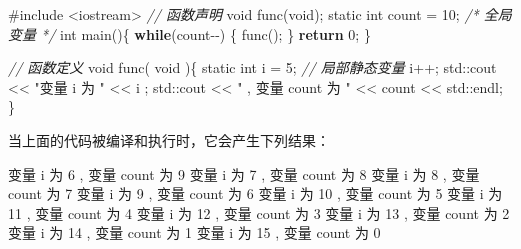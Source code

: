 \documentclass[
]{article}
\newenvironment{Shaded}{}{}
\newcommand{\AttributeTok}[1]{\textcolor[rgb]{0.49,0.56,0.16}{#1}}
\newcommand{\BuiltInTok}[1]{#1}
\newcommand{\CommentTok}[1]{\textcolor[rgb]{0.38,0.63,0.69}{\textit{#1}}}
\newcommand{\ControlFlowTok}[1]{\textcolor[rgb]{0.00,0.44,0.13}{\textbf{#1}}}
\newcommand{\DataTypeTok}[1]{\textcolor[rgb]{0.56,0.13,0.00}{#1}}
\newcommand{\DecValTok}[1]{\textcolor[rgb]{0.25,0.63,0.44}{#1}}
\newcommand{\ImportTok}[1]{#1}
\newcommand{\NormalTok}[1]{#1}
\newcommand{\OperatorTok}[1]{\textcolor[rgb]{0.40,0.40,0.40}{#1}}
\newcommand{\PreprocessorTok}[1]{\textcolor[rgb]{0.74,0.48,0.00}{#1}}
\newcommand{\StringTok}[1]{\textcolor[rgb]{0.25,0.44,0.63}{#1}}
\begin{document}
\begin{Shaded}
\begin{Highlighting}[]
\PreprocessorTok{\#include }\ImportTok{\textless{}iostream\textgreater{}}
 \CommentTok{// 函数声明}
\DataTypeTok{void}\NormalTok{ func}\OperatorTok{(}\DataTypeTok{void}\OperatorTok{);} 
\AttributeTok{static} \DataTypeTok{int}\NormalTok{ count }\OperatorTok{=} \DecValTok{10}\OperatorTok{;} \CommentTok{/* 全局变量 */}
\DataTypeTok{int}\NormalTok{ main}\OperatorTok{()\{}
   \ControlFlowTok{while}\OperatorTok{(}\NormalTok{count}\OperatorTok{{-}{-})}
   \OperatorTok{\{}
\NormalTok{      func}\OperatorTok{();}
   \OperatorTok{\}}
   \ControlFlowTok{return} \DecValTok{0}\OperatorTok{;}
\OperatorTok{\}}

\CommentTok{// 函数定义}
\DataTypeTok{void}\NormalTok{ func}\OperatorTok{(} \DataTypeTok{void} \OperatorTok{)\{}
   \AttributeTok{static} \DataTypeTok{int}\NormalTok{ i }\OperatorTok{=} \DecValTok{5}\OperatorTok{;} \CommentTok{// 局部静态变量}
\NormalTok{   i}\OperatorTok{++;}
   \BuiltInTok{std::}\NormalTok{cout}\OperatorTok{ \textless{}\textless{}} \StringTok{"变量 i 为 "} \OperatorTok{\textless{}\textless{}}\NormalTok{ i }\OperatorTok{;}
   \BuiltInTok{std::}\NormalTok{cout}\OperatorTok{ \textless{}\textless{}} \StringTok{" , 变量 count 为 "} \OperatorTok{\textless{}\textless{}}\NormalTok{ count }\OperatorTok{\textless{}\textless{}} \BuiltInTok{std::}\NormalTok{endl}\OperatorTok{;}
\OperatorTok{\}}
\end{Highlighting}
\end{Shaded}

当上面的代码被编译和执行时，它会产生下列结果：

\begin{Shaded}
\begin{Highlighting}[]
\NormalTok{变量 i 为 }\DecValTok{6} \OperatorTok{,}\NormalTok{ 变量 count 为 }\DecValTok{9}
\NormalTok{变量 i 为 }\DecValTok{7} \OperatorTok{,}\NormalTok{ 变量 count 为 }\DecValTok{8}
\NormalTok{变量 i 为 }\DecValTok{8} \OperatorTok{,}\NormalTok{ 变量 count 为 }\DecValTok{7}
\NormalTok{变量 i 为 }\DecValTok{9} \OperatorTok{,}\NormalTok{ 变量 count 为 }\DecValTok{6}
\NormalTok{变量 i 为 }\DecValTok{10} \OperatorTok{,}\NormalTok{ 变量 count 为 }\DecValTok{5}
\NormalTok{变量 i 为 }\DecValTok{11} \OperatorTok{,}\NormalTok{ 变量 count 为 }\DecValTok{4}
\NormalTok{变量 i 为 }\DecValTok{12} \OperatorTok{,}\NormalTok{ 变量 count 为 }\DecValTok{3}
\NormalTok{变量 i 为 }\DecValTok{13} \OperatorTok{,}\NormalTok{ 变量 count 为 }\DecValTok{2}
\NormalTok{变量 i 为 }\DecValTok{14} \OperatorTok{,}\NormalTok{ 变量 count 为 }\DecValTok{1}
\NormalTok{变量 i 为 }\DecValTok{15} \OperatorTok{,}\NormalTok{ 变量 count 为 }\DecValTok{0}
\end{Highlighting}
\end{Shaded}
\end{document}

